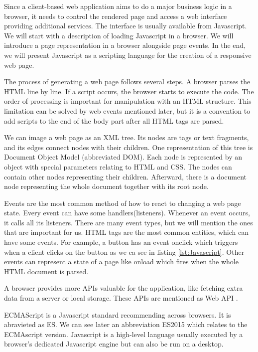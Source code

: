 Since a client-based web application aims to do a major business logic in a browser, it needs to control the rendered page and access a web interface providing additional services.
The interface is usually available from Javascript.
We will start with a description of loading Javascript in a browser.
We will introduce a page representation in a browser alongside page events.
In the end, we will present Javascript as a scripting language for the creation of a responsive web page.
\par
The process of generating a web page follows several steps.
A browser parses the HTML line by line. If a script occurs, the browser starts to execute the code.
The order of processing is important for manipulation with an HTML structure.
This limitation can be solved by web events mentioned later, but
it is a convention to add scripts to the end of the body part after all HTML tags are parsed.
\par
We can image a web page as an XML tree.
Its nodes are tags or text fragments, and its edges connect nodes with their children.
One representation of this tree is Document Object Model (abbreviated DOM).
Each node is represented by an object with special parameters relating to HTML and CSS. 
The nodes can contain other nodes representing their children.
Afterward, there is a document node representing the whole document together with its root node.
\par
Events are the most common method of how to react to changing a web page state.
Every event can have some handlers(listeners).
Whenever an event occurs, it calls all its listeners.
There are many event types, but we will mention the ones that are important for us.
HTML tags are the most common entities, which can have some events.
For example, a button has an event onclick which triggers when a client clicks on the button as we ca see in listing \ref{lst:Javascript}. 
Other events can represent a state of a page like onload which fires when the whole HTML document is parsed.
\par
A browser provides more APIs valuable for the application, like fetching extra data from a server or local storage.
These APIs are mentioned as Web API .
\par
ECMAScript is a Javascript standard recommending across browsers.
It is abravieted as ES.
We can see later an abbreviation ES2015 which relates to the ECMAscript version.
Javascript is a high-level language usually executed by a browser's dedicated Javascript engine but can also be run on a desktop.
